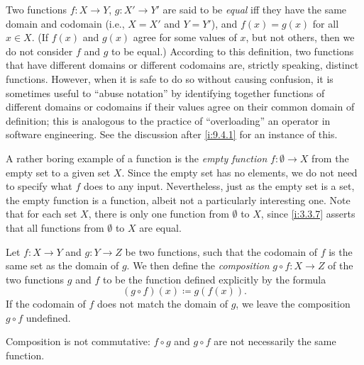 \begin{defn}\label{i:3.3.7}
  Two functions \(f : X \to Y\), \(g : X' \to Y'\) are said to be \emph{equal} iff they have the same domain and codomain (i.e., \(X = X'\) and \(Y = Y'\)), and \(f(x) = g(x)\) for all \(x \in X\).
  (If \(f(x)\) and \(g(x)\) agree for some values of \(x\), but not others, then we do not consider \(f\) and \(g\) to be equal.)
  According to this definition, two functions that have different domains or different codomains are, strictly speaking, distinct functions.
  However, when it is safe to do so without causing confusion, it is sometimes useful to ``abuse notation'' by identifying together functions of different domains or codomains if their values agree on their common domain of definition;
  this is analogous to the practice of ``overloading'' an operator in software engineering.
  See the discussion after \cref{i:9.4.1} for an instance of this.
\end{defn}

\setcounter{thm}{8}
\begin{eg}\label{i:3.3.9}
  A rather boring example of a function is the \emph{empty function} \(f : \emptyset \to X\) from the empty set to a given set \(X\).
  Since the empty set has no elements, we do not need to specify what \(f\) does to any input.
  Nevertheless, just as the empty set is a set, the empty function is a function, albeit not a particularly interesting one.
  Note that for each set \(X\), there is only one function from \(\emptyset\) to \(X\), since \cref{i:3.3.7} asserts that all functions from \(\emptyset\) to \(X\) are equal.
\end{eg}

\begin{defn}[Composition]\label{i:3.3.10}
  Let \(f : X \to Y\) and \(g : Y \to Z\) be two functions, such that the codomain of \(f\) is the same set as the domain of \(g\).
  We then define the \emph{composition} \(g \circ f : X \to Z\) of the two functions \(g\) and \(f\) to be the function defined explicitly by the formula
  \[
    (g \circ f)(x) \coloneqq g(f(x)).
  \]
  If the codomain of \(f\) does not match the domain of \(g\), we leave the composition \(g \circ f\) undefined.
\end{defn}

\begin{note}
  Composition is not commutative:
  \(f \circ g\) and \(g \circ f\) are not necessarily the same function.
\end{note}

